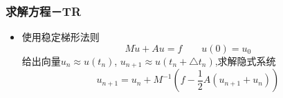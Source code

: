 \documentclass[notheorems,mathserif,table,compress]{beamer}  %
\begin{document}
%
\begin{frame}
\frametitle{求解方程－TR} 
\begin{itemize}
\item 使用稳定梯形法则
\begin{displaymath}
M\dot{u}+Au=f \qquad u(0)=u_0
\end{displaymath}
给出向量$u_n\approx u(t_n)$, $u_{n+1}\approx u(t_n+\triangle t_n)$,求解隐式系统
\begin{displaymath}
u_{n+1}=u_n+M^{-1}(f-\frac{1}{2}A(u_{n+1}+u_n))
\end{displaymath}
\end{itemize}
\end{frame}
\end{document}
